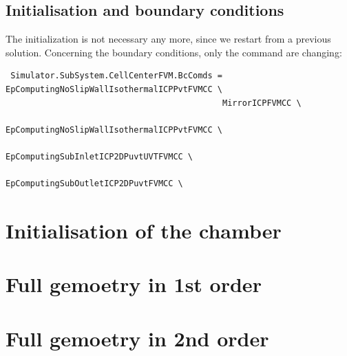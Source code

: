 \documentclass[11pt]{article}
\begin{document}
\subsection{Initialisation and boundary conditions}
The initialization is not necessary any more, since we restart from a previous solution.
Concerning the boundary conditions, only the command are changing:
\begin{verbatim}
 Simulator.SubSystem.CellCenterFVM.BcComds = EpComputingNoSlipWallIsothermalICPPvtFVMCC \
                                            MirrorICPFVMCC \
                                            EpComputingNoSlipWallIsothermalICPPvtFVMCC \
                                            EpComputingSubInletICP2DPuvtUVTFVMCC \
                                            EpComputingSubOutletICP2DPuvtFVMCC \
\end{verbatim}


\section{Initialisation of the chamber}

\section{Full gemoetry in 1st order}

\section{Full gemoetry in 2nd order}
\end{document}
